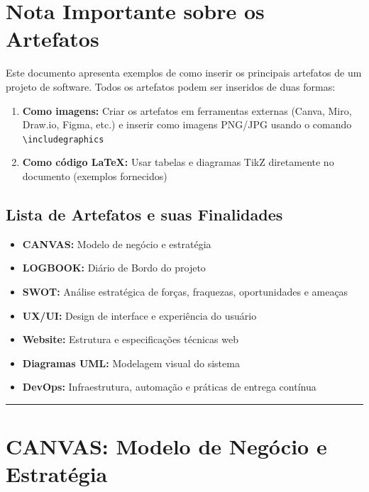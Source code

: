 \documentclass[11pt,a4paper]{article}
\begin{document}
\pagestyle{fancy}

\tableofcontents
\newpage

\section*{Nota Importante sobre os Artefatos}

\noindent Este documento apresenta exemplos de como inserir os principais artefatos de um projeto de software. Todos os artefatos podem ser inseridos de duas formas:

\begin{enumerate}
    \item \textbf{Como imagens:} Criar os artefatos em ferramentas externas (Canva, Miro, Draw.io, Figma, etc.) e inserir como imagens PNG/JPG usando o comando \texttt{\textbackslash includegraphics}
    \item \textbf{Como código LaTeX:} Usar tabelas e diagramas TikZ diretamente no documento (exemplos fornecidos)
\end{enumerate}

\subsection*{Lista de Artefatos e suas Finalidades}

\begin{itemize}
    \item \textbf{CANVAS:} Modelo de negócio e estratégia
    \item \textbf{LOGBOOK:} Diário de Bordo do projeto
    \item \textbf{SWOT:} Análise estratégica de forças, fraquezas, oportunidades e ameaças
    \item \textbf{UX/UI:} Design de interface e experiência do usuário
    \item \textbf{Website:} Estrutura e especificações técnicas web
    \item \textbf{Diagramas UML:} Modelagem visual do sistema
    \item \textbf{DevOps:} Infraestrutura, automação e práticas de entrega contínua
\end{itemize}

\vspace{0.5cm}
\noindent\rule{\textwidth}{0.5pt}

\newpage

\section{CANVAS: Modelo de Negócio e Estratégia}
\end{document}
